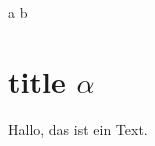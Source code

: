 \documentclass[DIV=15, twoside, cdgeometry=true]{tudscrreprt}
\begin{document}
\makeatletter
\meaning\bla
\ifdefined\bla
a
\else
b
\fi

\meaning\bla
\makeatother


\section{title $\alpha$}

%
%
%
%
%

Hallo, das ist ein Text.



\end{document}
